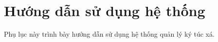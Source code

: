 \documentclass[../DoAn.tex]{subfiles}
\begin{document}
\section{Hướng dẫn sử dụng hệ thống}

Phụ lục này trình bày hướng dẫn sử dụng hệ thống quản lý ký túc xá.

\end{document}
